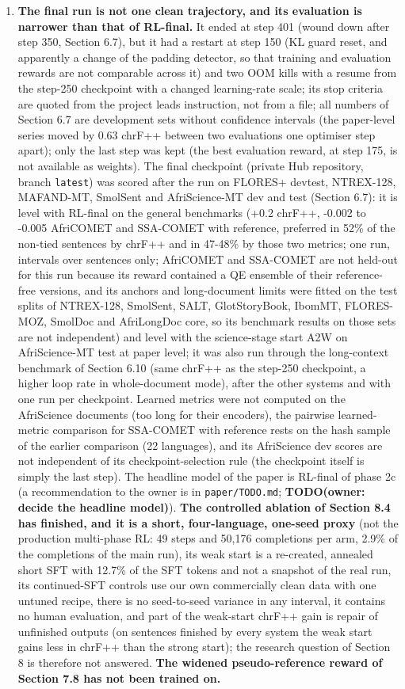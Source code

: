 \begin{enumerate}
\item
  \textbf{The final run is not one clean trajectory, and its evaluation is narrower than that of RL-final.} It ended at step 401 (wound down after step 350, Section 6.7), but it had a restart at step 150 (KL guard reset, and apparently a change of the padding detector, so that training and evaluation rewards are not comparable across it) and two OOM kills with a resume from the step-250 checkpoint with a changed learning-rate scale; its stop criteria are quoted from the project lead\textquotesingle s instruction, not from a file; all numbers of Section 6.7 are development sets without confidence intervals (the paper-level series moved by 0.63 chrF++ between two evaluations one optimiser step apart); only the last step was kept (the best evaluation reward, at step 175, is not available as weights). The final checkpoint (private Hub repository, branch \texttt{latest}) was scored after the run on FLORES+ devtest, NTREX-128, MAFAND-MT, SmolSent and AfriScience-MT dev and test (Section 6.7): it is level with RL-final on the general benchmarks (+0.2 chrF++, -0.002 to -0.005 AfriCOMET and SSA-COMET with reference, preferred in 52\% of the non-tied sentences by chrF++ and in 47-48\% by those two metrics; one run, intervals over sentences only; AfriCOMET and SSA-COMET are not held-out for this run because its reward contained a QE ensemble of their reference-free versions, and its anchors and long-document limits were fitted on the test splits of NTREX-128, SmolSent, SALT, GlotStoryBook, IbomMT, FLORES-MOZ, SmolDoc and AfriLongDoc core, so its benchmark results on those sets are not independent) and level with the science-stage start A2W on AfriScience-MT test at paper level; it was also run through the long-context benchmark of Section 6.10 (same chrF++ as the step-250 checkpoint, a higher loop rate in whole-document mode), after the other systems and with one run per checkpoint. Learned metrics were not computed on the AfriScience documents (too long for their encoders), the pairwise learned-metric comparison for SSA-COMET with reference rests on the hash sample of the earlier comparison (22 languages), and its AfriScience dev scores are not independent of its checkpoint-selection rule (the checkpoint itself is simply the last step). The headline model of the paper is RL-final of phase 2c (a recommendation to the owner is in \texttt{paper/TODO.md}; {\color{red}\textbf{TODO(owner: decide the headline model)}}). \textbf{The controlled ablation of Section 8.4 has finished, and it is a short, four-language, one-seed proxy} (not the production multi-phase RL: 49 steps and 50,176 completions per arm, 2.9\% of the completions of the main run), its weak start is a re-created, annealed short SFT with 12.7\% of the SFT tokens and not a snapshot of the real run, its continued-SFT controls use our own commercially clean data with one untuned recipe, there is no seed-to-seed variance in any interval, it contains no human evaluation, and part of the weak-start chrF++ gain is repair of unfinished outputs (on sentences finished by every system the weak start gains less in chrF++ than the strong start); the research question of Section 8 is therefore not answered. \textbf{The widened pseudo-reference reward of Section 7.8 has not been trained on.}

\end{enumerate}
